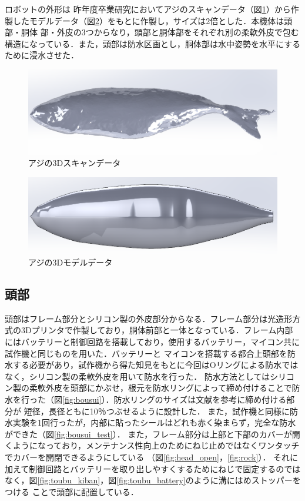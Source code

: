 ロボットの外形は
昨年度卒業研究においてアジのスキャンデータ（図\ref{fig:data_scan}）から作製したモデルデータ（図\ref{fig:data_model}）をもとに作製し，サイズは2倍とした．本機体は頭部・胴体
部・外皮の3つからなり，頭部と胴体部をそれぞれ別の柔軟外皮で包む構造になっている．また，頭部は防水区画とし，胴体部は水中姿勢を水平にするために浸水させた．

\begin{figure}[t]
    \centering
    \includegraphics[width=0.7\linewidth]{chapters/picture/scan.png}
    \caption{アジの3Dスキャンデータ}
    \label{fig:data_scan}
\end{figure}
\begin{figure}[t]
    \centering
    \includegraphics[width=0.7\linewidth]{chapters/picture/fishkinji2.png}
    \caption{アジの3Dモデルデータ}
    \label{fig:data_model}
\end{figure}

\subsection{頭部}
頭部はフレーム部分とシリコン製の外皮部分からなる．フレーム部分は光造形方式の3Dプリンタで作製しており，胴体前部と一体となっている．フレーム内部にはバッテリーと制御回路を搭載しており，使用するバッテリー，マイコン共に試作機と同じものを用いた．バッテリーと
マイコンを搭載する都合上頭部を防水する必要があり，試作機から得た知見をもとに今回はOリングによる防水ではなく，シリコン製の柔軟外皮を用いて防水を行った．
防水方法としてはシリコン製の柔軟外皮を頭部にかぶせ，根元を防水リングによって締め付けることで防水を行った（図\ref{fig:bousui}）．防水リングのサイズは文献\cite{juuiti}を参考に締め付ける部分が
短径，長径ともに10％つぶせるように設計した．
また，試作機と同様に防水実験を1回行ったが，内部に貼ったシールはどれも赤く染まらず，完全な防水ができた（図\ref{fig:bousui_test}）．
また，フレーム部分は上部と下部のカバーが開くようになっており，メンテナンス性向上のためにねじ止めではなくワンタッチでカバーを開閉できるようにしている
（図\ref{fig:head_open}，\ref{fig:rock}）．
それに加えて制御回路とバッテリーを取り出しやすくするためにねじで固定するのではなく，図\ref{fig:toubu_kiban}，図\ref{fig:toubu_battery}のように溝にはめストッパーをつける
ことで頭部に配置している．


